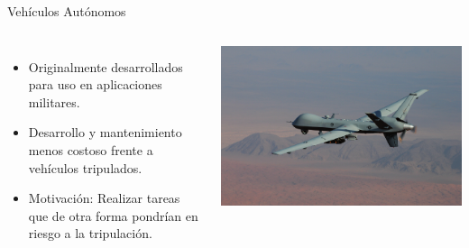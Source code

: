 \begin{frame}{Vehículos Autónomos}
	\begin{columns}
        \begin{itemize}
            \item<1->Originalmente desarrollados para uso en aplicaciones militares.
            \item<3->Desarrollo y mantenimiento menos costoso frente a vehículos tripulados.
            \item<4->Motivación: Realizar tareas que de otra forma pondrían en riesgo a la tripulación.
        \end{itemize}
            \includegraphics[width=\textwidth]{img/dron_militar_1}
	\end{columns}
\end{frame}

